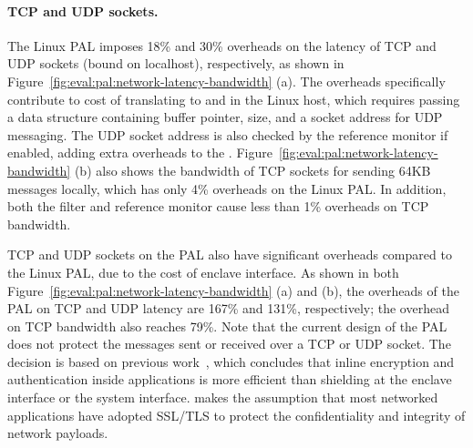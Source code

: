 \paragraph{TCP and UDP sockets.}
The Linux PAL imposes \roughly{}18\% and \roughly{}30\% overheads
on the latency of TCP and UDP sockets (bound on localhost),
respectively,
as shown in
Figure~\ref{fig:eval:pal:network-latency-bandwidth} (a).
The overheads specifically contribute
to cost of translating to  and 
in the Linux host,
which requires passing a data structure
containing buffer pointer, size, and a socket address
for UDP messaging. 
The UDP socket address is also checked by the reference monitor if enabled, adding extra overheads to the \hostapis{}.
Figure~\ref{fig:eval:pal:network-latency-bandwidth} (b)
also shows the bandwidth of TCP sockets
for sending 64KB messages locally,
which has only 4\% overheads on the Linux PAL.
In addition, both the \seccomp{} filter and reference monitor
cause less than 1\% overheads
on TCP bandwidth.





TCP and UDP sockets on the \sgx{} PAL
also have significant overheads compared to the Linux PAL,
due to the cost of enclave interface.
As shown in
both Figure~\ref{fig:eval:pal:network-latency-bandwidth}
(a) and (b),
the overheads of the \sgx{} PAL on TCP and UDP latency
are \roughly{}167\% and \roughly{}131\%,
respectively; the overhead on TCP bandwidth also reaches \roughly{}79\%. 
Note that the current design
of the \sgx{} PAL does not protect the messages sent or received
over a TCP or UDP socket.
The decision is based on previous work~\cite{osdi16scone},
which concludes that
inline encryption and authentication inside applications
is more efficient
than shielding at the enclave interface
or the system interface.
\graphenesgx{} makes the assumption
that most networked applications have adopted SSL/TLS
to protect the confidentiality and integrity of network payloads.



